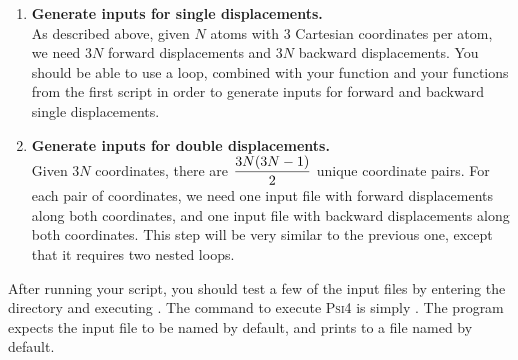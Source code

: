 \documentclass[11pt]{article}
\begin{document}
\begin{enumerate}[label=\textbf{\arabic*}]
follows:
\begin{addmargin}{2cm}{}
\begin{lstlisting}[language=python]
from molecule import *
make_input("x0x0_00",get_labels(),get_xyz())
\end{lstlisting}
\end{addmargin}
where the string  identifies the directory for the reference
configuration in my naming scheme,  is my function to return
labels (which lives in a script I have called ), and
 is my function to return a vector of coordinates (also in
).
\item {\bf Generate inputs for single displacements.}\\
As described above, given $N$ atoms with $3$ Cartesian coordinates per atom, we
need $3N$ forward displacements and $3N$ backward displacements. You should be
able to use a  loop, combined with your  function
and your functions from the first script in order to generate inputs for
forward and backward single displacements.
\item {\bf Generate inputs for double displacements.}\\
Given $3N$ coordinates, there are $\dfrac{3N(3N-1)}{2}$ unique coordinate pairs.
For each pair of coordinates, we need one input file with forward displacements
along both coordinates, and one input file with backward displacements along
both coordinates. This step will be very similar to the previous one, except
that it requires two nested  loops.
\end{enumerate}
After running your script, you should test a few of the input files by entering
the directory and executing .  The command to execute \textsc{Psi4}
is simply .  The program expects the input file to be named
 by default, and prints to a file named  by
default.
\end{document}
